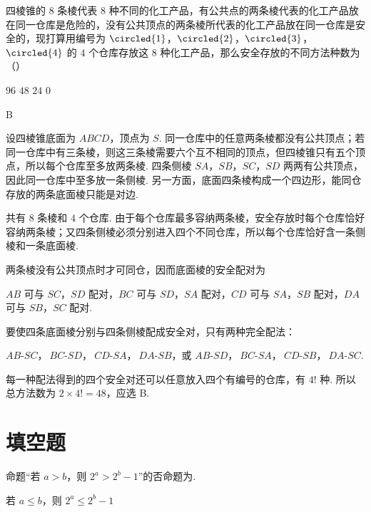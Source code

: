 \begin{problem}
四棱锥的 \(8\) 条棱代表 \(8\) 种不同的化工产品，有公共点的两条棱代表的化工产品放在同一仓库是危险的，没有公共顶点的两条棱所代表的化工产品放在同一仓库是安全的，现打算用编号为 \(\circled{1}\)，\(\circled{2}\)，\(\circled{3}\)，\(\circled{4}\) 的 \(4\) 个仓库存放这 \(8\) 种化工产品，那么安全存放的不同方法种数为（\quad）

\choices
    {\(96\)}
    {\(48\)}
    {\(24\)}
    {\(0\)}
\end{problem}

\begin{answer}
B
\end{answer}

\begin{solution}
设四棱锥底面为 \(ABCD\)，顶点为 \(S\). 同一仓库中的任意两条棱都没有公共顶点；若同一仓库中有三条棱，则这三条棱需要六个互不相同的顶点，但四棱锥只有五个顶点，所以每个仓库至多放两条棱. 四条侧棱 \(SA\)，\(SB\)，\(SC\)，\(SD\) 两两有公共顶点，因此同一仓库中至多放一条侧棱. 另一方面，底面四条棱构成一个四边形，能同仓存放的两条底面棱只能是对边.

共有 \(8\) 条棱和 \(4\) 个仓库. 由于每个仓库最多容纳两条棱，安全存放时每个仓库恰好容纳两条棱；又四条侧棱必须分别进入四个不同仓库，所以每个仓库恰好含一条侧棱和一条底面棱.

两条棱没有公共顶点时才可同仓，因而底面棱的安全配对为

\(AB\) 可与 \(SC\)，\(SD\) 配对，\(BC\) 可与 \(SD\)，\(SA\) 配对，\(CD\) 可与 \(SA\)，\(SB\) 配对，\(DA\) 可与 \(SB\)，\(SC\) 配对.

要使四条底面棱分别与四条侧棱配成安全对，只有两种完全配法：

\(AB\text{-}SC\)，\(\ BC\text{-}SD\)，\(\ CD\text{-}SA\)，\(\ DA\text{-}SB\)，或 \(AB\text{-}SD\)，\(\ BC\text{-}SA\)，\(\ CD\text{-}SB\)，\(\ DA\text{-}SC\).

每一种配法得到的四个安全对还可以任意放入四个有编号的仓库，有 \(4!\) 种. 所以总方法数为 \(2\times4!=48\)，应选 B.
\end{solution}

\section{填空题}
\begin{problem}
命题“若 \(a > b\)，则 \(2^a > 2^b - 1\)”的否命题为\fillinblank{}.
\end{problem}

\begin{answer}
若 \(a\leqslant b\)，则 \(2^a\leqslant2^b-1\)
\end{answer}

